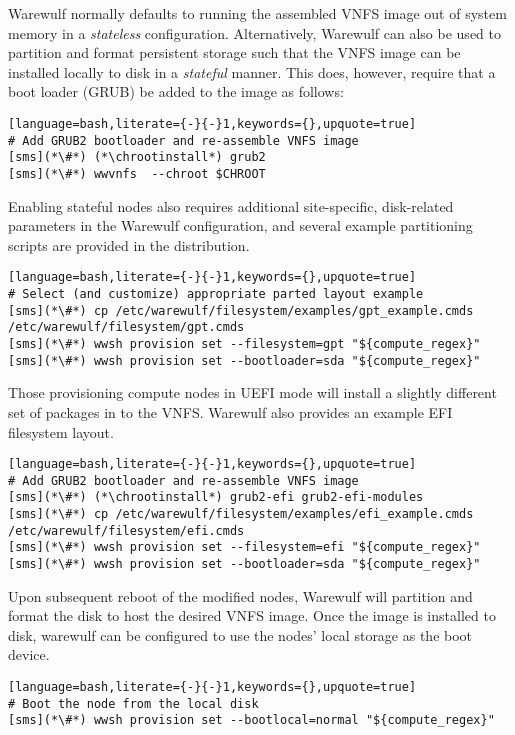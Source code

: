 Warewulf normally defaults to running the assembled VNFS image out of system
memory in a {\em stateless} configuration. Alternatively, Warewulf can also be
used to partition and format persistent storage such that the VNFS image can be
installed locally to disk in a {\em stateful} manner.  This does, however,
require that a boot loader (GRUB) be added to the image as follows:

\begin{lstlisting}[language=bash,literate={-}{-}1,keywords={},upquote=true]
# Add GRUB2 bootloader and re-assemble VNFS image
[sms](*\#*) (*\chrootinstall*) grub2
[sms](*\#*) wwvnfs  --chroot $CHROOT
\end{lstlisting}

\noindent Enabling stateful nodes also requires additional site-specific, disk-related
parameters in the Warewulf configuration, and several example partitioning scripts are 
provided in the distribution. 

\begin{lstlisting}[language=bash,literate={-}{-}1,keywords={},upquote=true]
# Select (and customize) appropriate parted layout example
[sms](*\#*) cp /etc/warewulf/filesystem/examples/gpt_example.cmds /etc/warewulf/filesystem/gpt.cmds
[sms](*\#*) wwsh provision set --filesystem=gpt "${compute_regex}" 
[sms](*\#*) wwsh provision set --bootloader=sda "${compute_regex}" 
\end{lstlisting}

\begin{center}
\begin{tcolorbox}[]
\small
Those provisioning compute nodes in UEFI mode will install a slightly different
set of packages in to the VNFS. Warewulf also provides an example EFI filesystem
layout.
\begin{lstlisting}[language=bash,literate={-}{-}1,keywords={},upquote=true]
# Add GRUB2 bootloader and re-assemble VNFS image
[sms](*\#*) (*\chrootinstall*) grub2-efi grub2-efi-modules
[sms](*\#*) cp /etc/warewulf/filesystem/examples/efi_example.cmds /etc/warewulf/filesystem/efi.cmds
[sms](*\#*) wwsh provision set --filesystem=efi "${compute_regex}" 
[sms](*\#*) wwsh provision set --bootloader=sda "${compute_regex}" 
\end{lstlisting}
\end{tcolorbox}
\end{center}

\noindent Upon subsequent reboot of the modified nodes, Warewulf will partition
and format the disk to host the desired VNFS image.  Once the image is installed 
to disk, warewulf can be configured to use the nodes' local storage as the boot 
device.

\begin{lstlisting}[language=bash,literate={-}{-}1,keywords={},upquote=true]
# Boot the node from the local disk
[sms](*\#*) wwsh provision set --bootlocal=normal "${compute_regex}"
\end{lstlisting}
